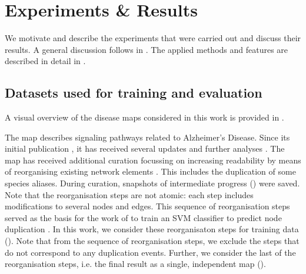 \documentclass[
	fontsize=10pt, %
	twoside=false, %
	secnumdepth=1, %
  toc=indentunnumbered %
]{kaobook}
\begin{document}



% 



\chapter{Experiments \& Results}
\label{sec:experiments-results}

We motivate and describe the experiments that were carried out and discuss their
results. A general discussion follows in . The applied
methods and features are described in detail in .

\section{Datasets used for training and evaluation}
\label{sec:datasets-used}

A visual overview of the disease maps considered in this work is provided in
.

The  map describes signaling pathways related to Alzheimer's
Disease. Since its initial publication
\cite{mizuno_AlzPathwayComprehensiveMap_2012}, it has received several updates
and further analyses \cite{ogishima_MapAlzheimerDiseasesignaling_2013,
  ogishima_AlzPathwayUpdatedMap_2016, mizuno_NetworkAnalysisComprehensive_2016}.
%
The map has received additional curation focussing on increasing readability by
means of reorganising existing network elements
\cite{ostaszewski_AlzPathwayRegorganisationSteps_2021}.
This includes the duplication
of some species aliases. During curation, snapshots of intermediate progress
() were saved. Note that the reorganisation steps are
not atomic: each step includes modifications to several nodes and edges.
This sequence of reorganisation steps served as the basis for the
work of \citeauthor{nielsen_MachineLearningSupport_2019} to train an SVM
classifier to predict node duplication
\cite{nielsen_MachineLearningSupport_2019}. In this work, we consider these
reorganisaton steps for training data ().
Note that from the sequence of reorganisation steps, we exclude the steps that
do not correspond to any duplication events.
Further, we consider
the last of the reorganisation steps, i.e. the final result as a single,
independent map ().
\end{document}

